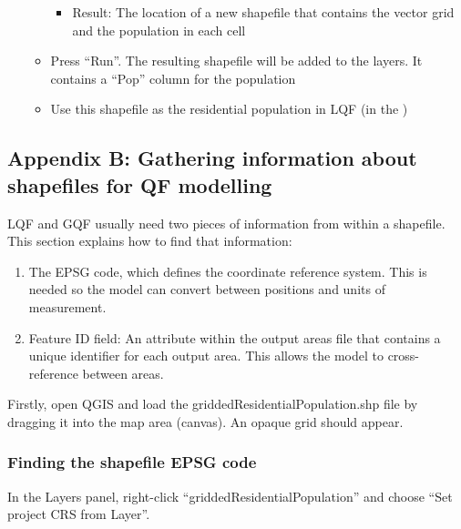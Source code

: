 \documentclass[letterpaper,10pt,english]{sphinxmanual}
\begin{document}
\begin{enumerate}
\begin{itemize}
\begin{itemize}
\item {} 
Result: The location of a new shapefile that contains the
vector grid and the population in each cell

\end{itemize}

\item {} 
Press “Run”. The resulting shapefile will be added to the layers.
It contains a “Pop” column for the population

\item {} 
Use this shapefile as the residential population in LQF (in the
{\hyperref[\detokenize{OtherManuals/LQF_Manual:data-sources-file}]{}})

\end{itemize}

\end{enumerate}


\subsection{Appendix B: Gathering information about shapefiles for QF modelling}
\label{\detokenize{OtherManuals/LQF_Manual:appendix-b-gathering-information-about-shapefiles-for-qf-modelling}}
LQF and GQF usually need two pieces of information from within a
shapefile. This section explains how to find that information:
\begin{enumerate}
\item {} 
The EPSG code, which defines the coordinate reference system. This is
needed so the model can convert between positions and units of
measurement.

\item {} 
Feature ID field: An attribute within the output areas file that
contains a unique identifier for each output area. This allows the
model to cross-reference between areas.

\end{enumerate}

Firstly, open QGIS and load the griddedResidentialPopulation.shp file by
dragging it into the map area (canvas). An opaque grid should appear.


\subsubsection{Finding the shapefile EPSG code}
\label{\detokenize{OtherManuals/LQF_Manual:finding-the-shapefile-epsg-code}}
In the Layers panel, right-click “griddedResidentialPopulation” and
choose “Set project CRS from Layer”.
\end{document}
